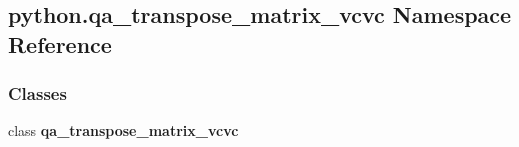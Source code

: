 \subsection{python.\+qa\+\_\+transpose\+\_\+matrix\+\_\+vcvc Namespace Reference}
\label{namespacepython_1_1qa__transpose__matrix__vcvc}
\subsubsection*{Classes}
\begin{DoxyCompactItemize}
\item 
class {\bf qa\+\_\+transpose\+\_\+matrix\+\_\+vcvc}
\end{DoxyCompactItemize}
